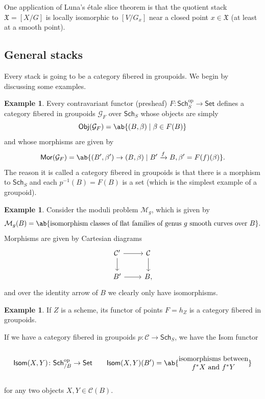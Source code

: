 \documentclass{amsart}
\theoremstyle{definition}
\newtheorem{exm}[thm]{Example}
\theoremstyle{remark}
\theoremstyle{plain}
\theoremstyle{definition}
\theoremstyle{remark}
\newcommand{\mc}[1]{\mathcal{#1}}
\newcommand{\mf}[1]{\mathfrak{#1}}
\newcommand{\on}[1]{\operatorname{#1}}
\newcommand{\ms}[1]{\mathsf{#1}}
\newcommand{\1}{\mathbf{1}}
\newcommand{\2}{\mathbf{2}}
\newcommand{\3}{\mathbf{3}}
\begin{document}
One application of Luna's \'etale slice theorem is that the quotient stack \(\mf{X} = [X/G]\) is locally isomorphic to \([V / G_x]\) near a closed point \(x \in \mf{X}\) (at least at a smooth point).

\subsection{General stacks}%
\label{sub:General stacks}

Every stack is going to be a category fibered in groupoids. We begin by discussing some examples.

\begin{exm}
    Every contravariant functor (presheaf) \(F \colon \ms{Sch}_S^{\on{op}} \to \ms{Set}\) defines a category fibered in groupoids \(\mc{G}_F\) over \(\ms{Sch}_S\) whose objects are simply 
    \[ \ms{Obj}(\mc{G}_F) = \ab\{ (B, \beta) \mid \beta \in F(B) \} \]
    and whose morphisms are given by
    \[ \ms{Mor}(\mc{G}_F) = \ab\{ (B', \beta') \to (B, \beta) \mid B' \xrightarrow{f} B, \beta' = F(f)(\beta) \}. \]
    The reason it is called a category fibered in groupoids is that there is a morphism to \(\ms{Sch}_S\) and each \(p^{-1}(B) = F(B)\) is a set (which is the simplest example of a groupoid).
\end{exm}

\begin{exm}
    Consider the moduli problem \(\mc{M}_g\), which is given by
    \[ \mc{M}_g(B) = \ab\{ \text{isomorphism classes of flat families of genus } g \text{ smooth curves over } B \}. \]
    Morphisms are given by Cartesian diagrams
    \begin{equation*}
    \begin{tikzcd}
        \mc{C}' \ar{r} \ar{d} & \mc{C} \ar{d} \\
        B' \ar{r} & B,
    \end{tikzcd}
    \end{equation*}
    and over the identity arrow of \(B\) we clearly only have isomorphisms.
\end{exm}

\begin{exm}
    If \(Z\) is a scheme, its functor of points \(F = h_Z\) is a category fibered in groupoids.
\end{exm}

If we have a category fibered in groupoids \(p \colon \mc{C} \to \ms{Sch}_S\), we have the Isom functor
\[ \ms{Isom}(X, Y) \colon \ms{Sch}_{/B}^{\on{op}} \to \ms{Set} \qquad \ms{Isom}(X, Y)(B') = \ab\{ \Centerstack{ {isomorphisms between} {$f^* X$ and $f^* Y$} } \} \]
for any two objects \(X, Y \in \mc{C}(B)\).
\end{document}
